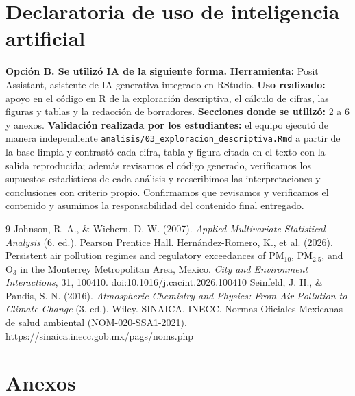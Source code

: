 \documentclass[11pt,letterpaper]{article}
\begin{document}
\section{Declaratoria de uso de inteligencia artificial}
\textbf{Opci\'on B. Se utiliz\'o IA de la siguiente forma.} \textbf{Herramienta:} Posit Assistant, asistente de IA generativa integrado en RStudio. \textbf{Uso realizado:} apoyo en el c\'odigo en R de la exploraci\'on descriptiva, el c\'alculo de cifras, las figuras y tablas y la redacci\'on de borradores. \textbf{Secciones donde se utiliz\'o:} 2 a 6 y anexos. \textbf{Validaci\'on realizada por los estudiantes:} el equipo ejecut\'o de manera independiente \nolinkurl{analisis/03_exploracion_descriptiva.Rmd} a partir de la base limpia y contrast\'o cada cifra, tabla y figura citada en el texto con la salida reproducida; adem\'as revisamos el c\'odigo generado, verificamos los supuestos estad\'isticos de cada an\'alisis y reescribimos las interpretaciones y conclusiones con criterio propio. Confirmamos que revisamos y verificamos el contenido y asumimos la responsabilidad del contenido final entregado.

\begin{thebibliography}{9}
\small
\setlength{\itemsep}{0pt}
 Johnson, R. A., \& Wichern, D. W. (2007). \textit{Applied Multivariate Statistical Analysis} (6.\textordfeminine{} ed.). Pearson Prentice Hall.
 Hern\'andez-Romero, K., et al. (2026). Persistent air pollution regimes and regulatory exceedances of PM$_{10}$, PM$_{2.5}$, and O$_3$ in the Monterrey Metropolitan Area, Mexico. \textit{City and Environment Interactions}, 31, 100410. doi:10.1016/j.cacint.2026.100410
 Seinfeld, J. H., \& Pandis, S. N. (2016). \textit{Atmospheric Chemistry and Physics: From Air Pollution to Climate Change} (3.\textordfeminine{} ed.). Wiley.
 SINAICA, INECC. Normas Oficiales Mexicanas de salud ambiental (NOM-020-SSA1-2021). \url{https://sinaica.inecc.gob.mx/pags/noms.php}
\end{thebibliography}

\clearpage
\appendix
\section*{Anexos}
\renewcommand{\thetable}{A\arabic{table}}
\renewcommand{\thefigure}{A\arabic{figure}}
\setcounter{table}{0}
\setcounter{figure}{0}
\end{document}
